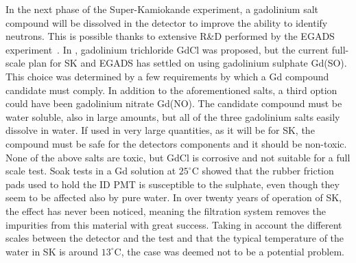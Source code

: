In the next phase of the Super-Kamiokande experiment, a gadolinium salt compound %
will be dissolved in the detector to improve the ability to identify neutrons.
This is possible thanks to extensive R\&D performed by the EGADS experiment~\cite{Ikeda:2019pcm}.
In , gadolinium trichloride GdCl was proposed, %
but the current full-scale plan for SK and EGADS has settled on using gadolinium sulphate Gd(SO).
This choice was determined by a few requirements by which a Gd compound candidate must comply.
In addition to the aforementioned salts, a third option could have been gadolinium nitrate Gd(NO).
The candidate compound must be water soluble, also in large amounts, but all of the three gadolinium salts %
easily dissolve in water.
If used in very large quantities, as it will be for SK, the compound must be safe for %
the detectors components and it should be non-toxic. %
None of the above salts are toxic, but GdCl is corrosive and not suitable for a full scale test.
Soak tests in a Gd solution at $25^\circ$C showed that the rubber friction pads used to hold the ID PMT %
is susceptible to the sulphate, even though they seem to be affected also by pure water.
In over twenty years of operation of SK, the effect has never been noticed, meaning the filtration system %
removes the impurities from this material with great success.
Taking in account the different scales between the detector and the test and that the typical temperature %
of the water in SK is around $13^\circ$C, the case was deemed not to be a potential problem.
